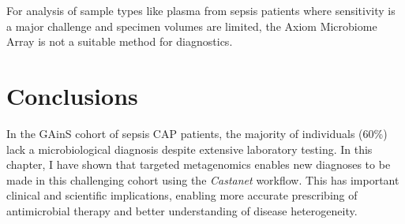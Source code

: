 For analysis of sample types like plasma from sepsis patients where sensitivity is a major challenge and specimen volumes are limited, the Axiom Microbiome Array is not a suitable method for diagnostics.

\section{Conclusions}
In the GAinS cohort of sepsis CAP patients, the majority of individuals (60\%) lack a microbiological diagnosis despite extensive laboratory testing. In this chapter, I have shown that targeted metagenomics enables new diagnoses to be made in this challenging cohort using the \textit{Castanet} workflow. This has important clinical and scientific implications, enabling more accurate prescribing of antimicrobial therapy and better understanding of disease heterogeneity. 
